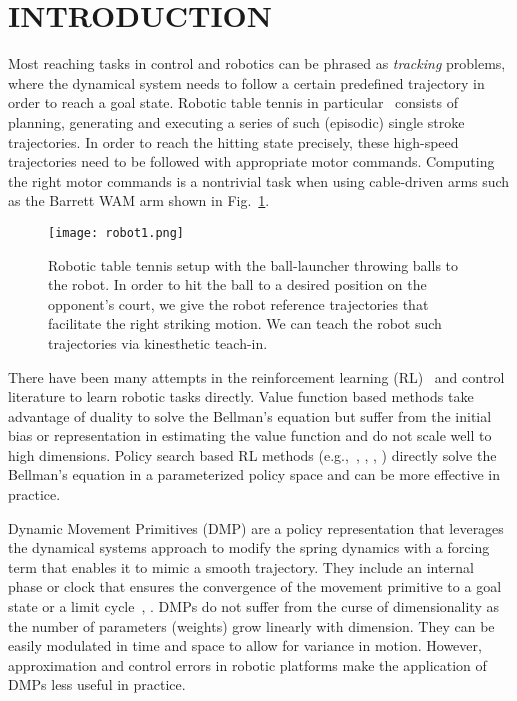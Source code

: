 \section{INTRODUCTION}\label{introduction}


Most reaching tasks in control and robotics can be phrased as \emph{tracking} problems, where the dynamical system needs to follow a certain predefined trajectory in order to reach a goal state. Robotic table tennis in particular~\cite{Muelling13} consists of planning, generating and executing a series of such (episodic) single stroke trajectories. In order to reach the hitting state precisely, these high-speed trajectories need to be followed with appropriate motor commands. Computing the right motor commands is a nontrivial task when using cable-driven arms such as the Barrett WAM arm shown in Fig.~\ref{robot}.

\begin{figure}[t!]
\center
\texttt{[image: robot1.png]}			
\caption{Robotic table tennis setup with the ball-launcher throwing balls to the robot. In order to hit the ball to a desired position on the opponent's court, we give the robot reference trajectories that facilitate the right striking motion. We can teach the robot such trajectories via kinesthetic teach-in.}
\label{robot}
\end{figure}

There have been many attempts in the reinforcement learning (RL)~\cite{Sutton98} and control literature to learn robotic tasks directly. Value function based methods take advantage of duality to solve the Bellman's equation but suffer from the initial bias or representation in estimating the value function and do not scale well to high dimensions. Policy search based RL methods (e.g.,~\cite{Kober08}, \cite{Peter10}, \cite{Theodorou10}, \cite{Deisenroth11}) directly solve the Bellman's equation in a parameterized policy space and can be more effective in practice. 

Dynamic Movement Primitives (DMP) are a policy representation that leverages the dynamical systems approach to modify the spring dynamics with a forcing term that enables it to mimic a smooth trajectory. They include an internal phase or clock that ensures the convergence of the movement primitive to a goal state or a limit cycle~\cite{Ijspeert13}, \cite{Schaal07}. DMPs do not suffer from the curse of dimensionality as the number of parameters (weights) grow linearly with dimension. They can be easily modulated in time and space to allow for variance in motion. However, approximation and control errors in robotic platforms make the application of DMPs less useful in practice. %

